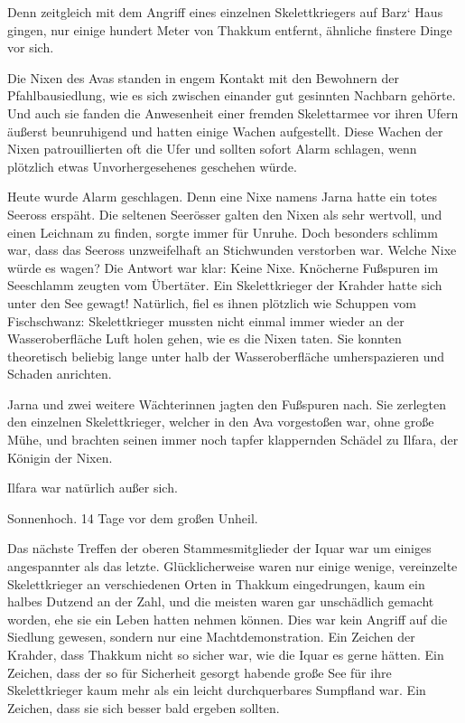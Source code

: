 Denn zeitgleich mit dem Angriff eines einzelnen Skelettkriegers auf Barz‘ Haus gingen, nur einige hundert Meter von Thakkum entfernt, ähnliche finstere Dinge vor sich.

Die Nixen des Avas standen in engem Kontakt mit den Bewohnern der Pfahlbausiedlung, wie es sich zwischen einander gut gesinnten Nachbarn gehörte. Und auch sie fanden die Anwesenheit einer fremden Skelettarmee vor ihren Ufern äußerst beunruhigend und hatten einige Wachen aufgestellt. Diese Wachen der Nixen patrouillierten oft die Ufer und sollten sofort Alarm schlagen, wenn plötzlich etwas Unvorhergesehenes geschehen würde.

Heute wurde Alarm geschlagen. Denn eine Nixe namens Jarna hatte ein totes Seeross erspäht. Die seltenen Seerösser galten den Nixen als sehr wertvoll, und einen Leichnam zu finden, sorgte immer für Unruhe. Doch besonders schlimm war, dass das Seeross unzweifelhaft an Stichwunden verstorben war. Welche Nixe würde es wagen? Die Antwort war klar: Keine Nixe. Knöcherne Fußspuren im Seeschlamm zeugten vom Übertäter. Ein Skelettkrieger der Krahder hatte sich unter den See gewagt! Natürlich, fiel es ihnen plötzlich wie Schuppen vom Fischschwanz: Skelettkrieger mussten nicht einmal immer wieder an der Wasseroberfläche Luft holen gehen, wie es die Nixen taten. Sie konnten theoretisch beliebig lange unter halb der Wasseroberfläche umherspazieren und Schaden anrichten.

Jarna und zwei weitere Wächterinnen jagten den Fußspuren nach. Sie zerlegten den einzelnen Skelettkrieger, welcher in den Ava vorgestoßen war, ohne große Mühe, und brachten seinen immer noch tapfer klappernden Schädel zu Ilfara, der Königin der Nixen.

Ilfara war natürlich außer sich.\bigskip







Sonnenhoch. 14 Tage vor dem großen Unheil.\bigskip



Das nächste Treffen der oberen Stammesmitglieder der Iquar war um einiges angespannter als das letzte. Glücklicherweise waren nur einige wenige, vereinzelte Skelettkrieger an verschiedenen Orten in Thakkum eingedrungen, kaum ein halbes Dutzend an der Zahl, und die meisten waren gar unschädlich gemacht worden, ehe sie ein Leben hatten nehmen können. Dies war kein Angriff auf die Siedlung gewesen, sondern nur eine Machtdemonstration. Ein Zeichen der Krahder, dass Thakkum nicht so sicher war, wie die Iquar es gerne hätten. Ein Zeichen, dass der so für Sicherheit gesorgt habende große See für ihre Skelettkrieger kaum mehr als ein leicht durchquerbares Sumpfland war. Ein Zeichen, dass sie sich besser bald ergeben sollten.

